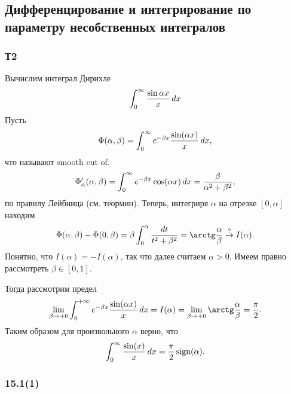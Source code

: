 \subsection{Дифференцирование и интегрирование по параметру несобственных интегралов}

\subsubsection*{Т2}

Вычислим интеграл Дирихле
\begin{equation*}
    \int_0^\infty \frac{\sin \alpha x}{x} \, d x
\end{equation*}
Пусть
\begin{equation*}
    \Phi(\alpha, \beta) = \int_0^{\infty} e^{-\beta x} \frac{\sin (\alpha x)}{x} \, d x,
\end{equation*}
что называют smooth cut of. 
\begin{equation*}
    \Phi'_\alpha (\alpha, \beta) = 
    \int_0^\infty e^{-\beta x} \cos (\alpha x) \, d x = \frac{\beta}{\alpha^2 + \beta^2},
\end{equation*}
по правилу Лейбница (см. теормин). Теперь, интегриря $\alpha$ на отрезке $[0, \alpha]$ находим
\begin{equation*}
    \Phi(\alpha, \beta) - \Phi(0, \beta) = \beta \int_{0}^{\alpha} \frac{d t}{t^2 + \beta^2} = 
    \arctg \frac{\alpha}{\beta} \overset{\mathrm{?}}{\to} I(\alpha).
\end{equation*}
Понятно, что $I(\alpha) = - I(\alpha)$, так что далее считаем $\alpha > 0$. Имеем правно рассмотреть $\beta \in [0, 1]$.

Тогда рассмотрим предел
\begin{equation*}
    \lim_{\beta \to +0} \int_0^{+\infty} e^{-\beta x} \frac{\sin(\alpha x)}{x} \d x = I(\alpha) =
    \lim_{\beta \to +0} \arctg \frac{\alpha}{\beta} = \frac{\pi}{2}.
\end{equation*}
Таким образом для произвольного $\alpha$ верно, что
\begin{equation}
    \int_0^{\infty} \frac{\sin(x)}{x} \, d x = \frac{\pi}{2} \mathop{\mathrm{sign}}\nolimits (\alpha).
\end{equation}


% 


\subsubsection*{15.1(1)}

